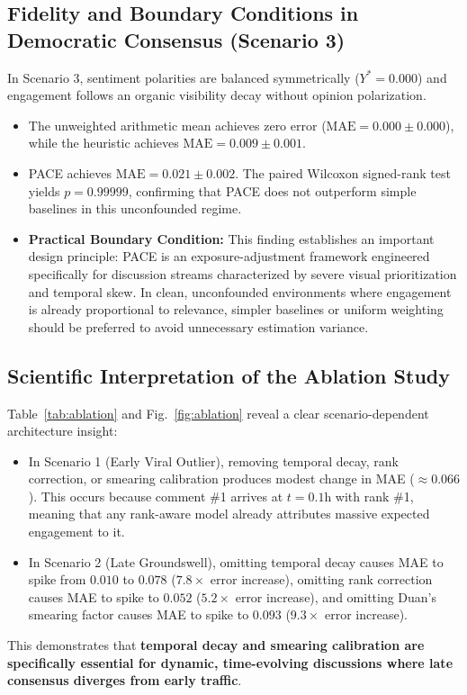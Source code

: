\documentclass[journal]{IEEEtran}
\begin{document}
\subsection{Fidelity and Boundary Conditions in Democratic Consensus (Scenario 3)}
In Scenario 3, sentiment polarities are balanced symmetrically ($Y^* = 0.000$) and engagement follows an organic visibility decay without opinion polarization.
\begin{itemize}
    \item The unweighted arithmetic mean achieves zero error ($\text{MAE} = 0.000 \pm 0.000$), while the heuristic achieves $\text{MAE} = 0.009 \pm 0.001$.
    \item PACE achieves $\text{MAE} = 0.021 \pm 0.002$. The paired Wilcoxon signed-rank test yields $p = 0.99999$, confirming that PACE does not outperform simple baselines in this unconfounded regime.
    \item \textbf{Practical Boundary Condition:} This finding establishes an important design principle: PACE is an exposure-adjustment framework engineered specifically for discussion streams characterized by severe visual prioritization and temporal skew. In clean, unconfounded environments where engagement is already proportional to relevance, simpler baselines or uniform weighting should be preferred to avoid unnecessary estimation variance.
\end{itemize}

\subsection{Scientific Interpretation of the Ablation Study}
Table~\ref{tab:ablation} and Fig.~\ref{fig:ablation} reveal a clear scenario-dependent architecture insight:
\begin{itemize}
    \item In Scenario 1 (Early Viral Outlier), removing temporal decay, rank correction, or smearing calibration produces modest change in MAE ($\approx 0.066$). This occurs because comment \#1 arrives at $t=0.1\text{h}$ with rank \#1, meaning that any rank-aware model already attributes massive expected engagement to it.
    \item In Scenario 2 (Late Groundswell), omitting temporal decay causes MAE to spike from $0.010$ to $0.078$ ($7.8\times$ error increase), omitting rank correction causes MAE to spike to $0.052$ ($5.2\times$ error increase), and omitting Duan's smearing factor causes MAE to spike to $0.093$ ($9.3\times$ error increase).
\end{itemize}
This demonstrates that \textbf{temporal decay and smearing calibration are specifically essential for dynamic, time-evolving discussions where late consensus diverges from early traffic}.
\end{document}
